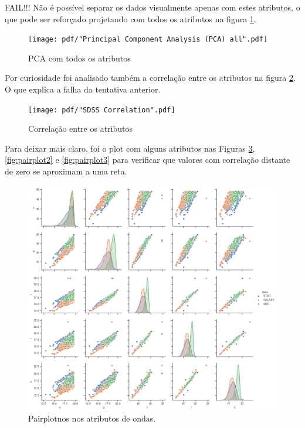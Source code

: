 FAIL!!! Não é possível separar os dados visualmente apenas com estes atributos, o que pode ser reforçado
projetando com todos os atributos na figura \ref{fig:pcaprojall}.

\begin{figure}[H]
  \centering
  \texttt{[image: pdf/"Principal Component Analysis (PCA) all".pdf]}
  \caption{PCA com todos os atributos}
  \label{fig:pcaprojall}
\end{figure}

Por curiosidade foi analisado também a correlação entre os atributos na figura \ref{fig:corrdata}. O que explica a falha da tentativa anterior.

\begin{figure}[H]
  \centering
  \texttt{[image: pdf/"SDSS Correlation".pdf]}
  \caption{Correlação entre os atributos}
  \label{fig:corrdata}
\end{figure}

Para deixar mais claro, foi o plot com alguns atributos nas Figuras \ref{fig:pairplot1}, \ref{fig:pairplot2} e \ref{fig:pairplot3} para verificar que valores com correlação distante de zero se aproximam a uma reta.

\begin{figure}[H]
  \centering
  \includegraphics[width=\textwidth]{pdf/snsplot1.png}
  \caption{Pairplotnos nos atributos de ondas.}
  \label{fig:pairplot1}
\end{figure}

